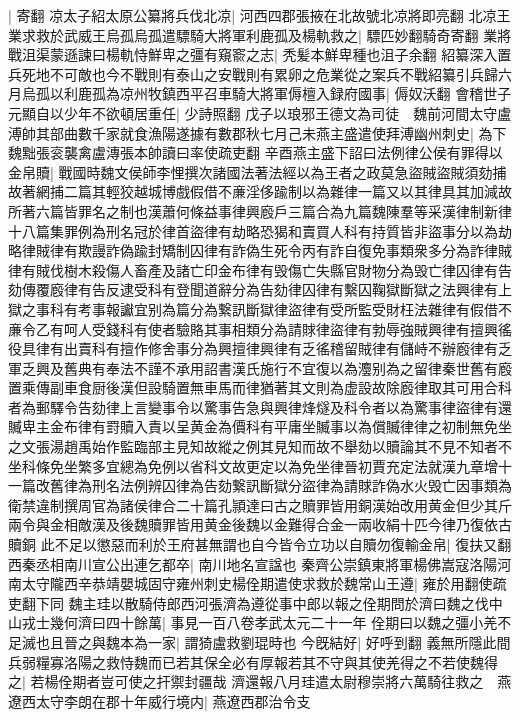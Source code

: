 |{
	寄翻}
凉太子紹太原公纂將兵伐北凉|{
	河西四郡張掖在北故號北凉將即亮翻}
北凉王業求救於武威王烏孤烏孤遣驃騎大將軍利鹿孤及楊軌救之|{
	驃匹妙翻騎奇寄翻}
業將戰沮渠蒙遜諫曰楊軌恃鮮卑之彊有窺窬之志|{
	秃髪本鮮卑種也沮子余翻}
紹纂深入置兵死地不可敵也今不戰則有泰山之安戰則有累卵之危業從之案兵不戰紹纂引兵歸六月烏孤以利鹿孤為凉州牧鎮西平召車騎大將軍傉檀入録府國事|{
	傉奴沃翻}
會稽世子元顯自以少年不欲頓居重任|{
	少詩照翻}
戊子以琅邪王德文為司徒　魏前河間太守盧溥帥其部曲數千家就食漁陽遂據有數郡秋七月己未燕主盛遣使拜溥幽州刺史|{
	為下魏黜張衮襲禽盧漙張本帥讀曰率使疏吏翻}
辛酉燕主盛下詔曰法例律公侯有罪得以金帛贖|{
	戰國時魏文侯師李悝撰次諸國法著法經以為王者之政莫急盜賊盜賊須劾捕故著網捕二篇其輕狡越城博戲假借不亷淫侈踰制以為雜律一篇又以其律具其加減故所著六篇皆罪名之制也漢蕭何條益事律興廏戶三篇合為九篇魏陳羣等采漢律制新律十八篇集罪例為刑名冠於律首盜律有劫略恐猲和賣買人科有持質皆非盜事分以為劫略律賊律有欺謾詐偽踰封矯制囚律有詐偽生死令丙有詐自復免事類衆多分為詐律賊律有賊伐樹木殺傷人畜產及諸亡印金布律有毁傷亡失縣官財物分為毁亡律囚律有告劾傳覆廏律有告反逮受科有登聞道辭分為告劾律囚律有繫囚鞠獄斷獄之法興律有上獄之事科有考事報讞宜别為篇分為繋訊斷獄律盜律有受所監受財枉法雜律有假借不亷令乙有呵人受錢科有使者驗賂其事相類分為請賕律盜律有勃辱強賊興律有擅興徭役具律有出賣科有擅作修舍事分為興擅律興律有乏徭稽留賊律有儲峙不辦廏律有乏軍乏興及舊典有奉法不謹不承用詔書漢氏施行不宜復以為灋别為之留律秦世舊有廏置乘傳副車食厨後漢但設騎置無車馬而律猶著其文則為虚設故除廏律取其可用合科者為郵驛令告劾律上言變事令以驚事告急與興律烽燧及科令者以為驚事律盜律有還贓卑主金布律有罸贖入責以呈黄金為價科有平庸坐贓事以為償贓律律之初制無免坐之文張湯趙禹始作監臨部主見知故縱之例其見知而故不舉劾以贖論其不見不知者不坐科條免坐繁多宜總為免例以省科文故更定以為免坐律晉初賈充定法就漢九章增十一篇改舊律為刑名法例辨囚律為告劾繋訊斷獄分盜律為請賕詐偽水火毁亡因事類為衛禁違制撰周官為諸侯律合二十篇孔頴達曰古之贖罪皆用銅漢始改用黄金但少其斤兩令與金相敵漢及後魏贖罪皆用黄金後魏以金難得合金一兩收絹十匹今律乃復依古贖銅}
此不足以懲惡而利於王府甚無謂也自今皆令立功以自贖勿復輸金帛|{
	復扶又翻}
西秦丞相南川宣公出連乞都卒|{
	南川地名宣諡也}
秦齊公崇鎮東將軍楊佛嵩寇洛陽河南太守隴西辛恭靖嬰城固守雍州刺史楊佺期遣使求救於魏常山王遵|{
	雍於用翻使疏吏翻下同}
魏主珪以散騎侍郎西河張濟為遵從事中郎以報之佺期問於濟曰魏之伐中山戎士幾何濟曰四十餘萬|{
	事見一百八卷孝武太元二十一年}
佺期曰以魏之彊小羌不足滅也且晉之與魏本為一家|{
	謂猗盧救劉琨時也}
今旣結好|{
	好呼到翻}
義無所隱此間兵弱糧寡洛陽之救恃魏而已若其保全必有厚報若其不守與其使羌得之不若使魏得之|{
	若楊佺期者豈可使之扞禦封疆哉}
濟還報八月珪遣太尉穆崇將六萬騎往救之　燕遼西太守李朗在郡十年威行境内|{
	燕遼西郡治令支}
